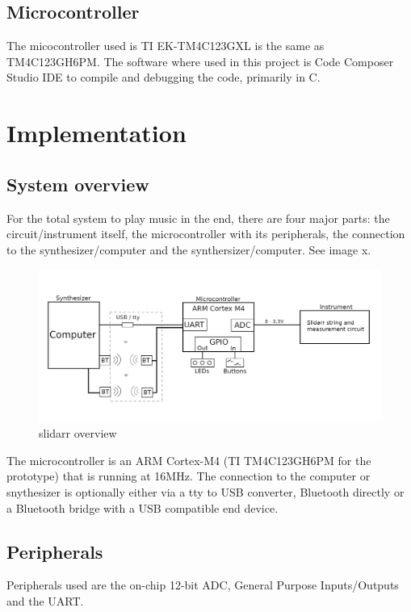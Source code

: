 \documentclass{article}
\begin{document}
\subsection{Microcontroller}
The micocontroller used is TI EK-TM4C123GXL is the same as TM4C123GH6PM. The software where used in this project is Code Composer Studio IDE to compile and debugging the code, primarily in C.

\section{Implementation}

\subsection{System overview}
For the total system to play music in the end, there are four major parts: the circuit/instrument itself, the microcontroller with its peripherals, the connection to the synthesizer/computer and the synthersizer/computer. See image x.

\begin{figure}[ht]
  \centering
  \includegraphics[width=1\textwidth]{BasicSystemOverview.png}
  \caption{slidarr overview}
  \label{fig:slidarr overview}
\end{figure}

The microcontroller is an ARM Cortex-M4 (TI TM4C123GH6PM for the prototype) that is running at 16MHz. The connection to the computer or snythesizer is optionally either via a tty to USB converter, Bluetooth directly or a Bluetooth bridge with a USB compatible end device.

\subsection{Peripherals}
Peripherals used are the on-chip 12-bit ADC, General Purpose Inputs/Outputs and the UART.
\end{document}

